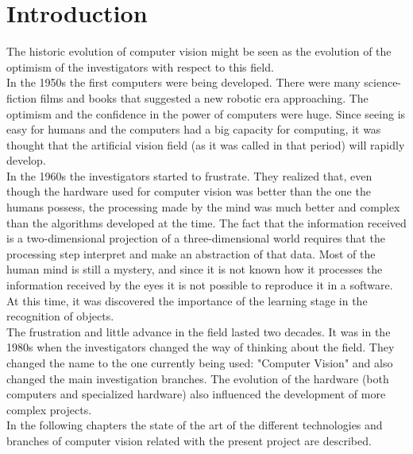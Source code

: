 \section{Introduction}

The historic evolution of computer vision might be seen as the evolution of the optimism of the investigators with respect to this field. 
\\

In the 1950s the first computers were being developed. There were many science-fiction films and books that suggested a new robotic era approaching. The optimism and the confidence in the power of computers were huge. 
Since seeing is easy for humans and the computers had a big capacity for computing, it was thought that the artificial vision field (as it was called in that period) will rapidly develop. 
\\

In the 1960s the investigators started to frustrate. They realized that, even though the hardware used for computer vision was better than the one the humans possess, the processing made by the mind was much better and complex than the algorithms developed at the time. 
The fact that the information received is a two-dimensional projection of a three-dimensional world requires that the processing step interpret and make an abstraction of that data. Most of the human mind is still a mystery, and since it is not known how it processes the information received by the eyes it is not possible to reproduce it in a software. 
At this time, it was discovered the importance of the learning stage in the recognition of objects. 
\\

The frustration and little advance in the field lasted two decades. It was in the 1980s when the investigators changed the way of thinking about the field. They changed the name to the one currently being used: "Computer Vision" and also changed the main investigation branches.
The evolution of the hardware (both computers and specialized hardware) also influenced the development of more complex projects. 
\\

In the following chapters the state of the art of the different technologies and branches of computer vision related with the present project are described. 
